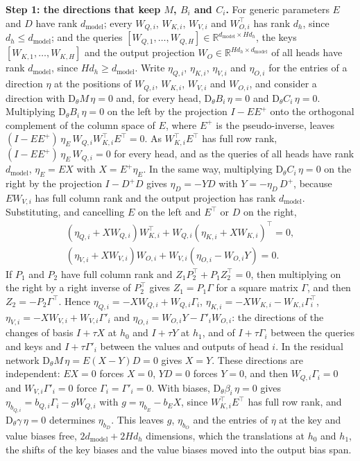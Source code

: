 \documentclass[10pt]{article}
\theoremstyle{definition}
\theoremstyle{remark}
\newcommand{\R}{\mathbb{R}}
\newcommand{\dm}{d_{\mathrm{model}}}
\newcommand{\Der}{\mathrm{D}}
\newcommand{\para}[1]{\smallskip\noindent\textbf{#1}\hspace{0.5em}}
\begin{document}
\para{Step 1: the directions that keep $M$, $B_i$ and $C_i$.} For generic parameters $E$ and $D$ have rank $\dm$; every $W_{Q,i}$, $W_{K,i}$, $W_{V,i}$ and $W_{O,i}^\top$ has rank $d_h$, since $d_h \le \dm$; and the queries $[W_{Q,1}, \dots, W_{Q,H}] \in \R^{\dm\times Hd_h}$, the keys $[W_{K,1}, \dots, W_{K,H}]$ and the output projection $W_O \in \R^{Hd_h\times\dm}$ of all heads have rank $\dm$, since $Hd_h \ge \dm$. Write $\eta_{Q,i}$, $\eta_{K,i}$, $\eta_{V,i}$ and $\eta_{O,i}$ for the entries of a direction $\eta$ at the positions of $W_{Q,i}$, $W_{K,i}$, $W_{V,i}$ and $W_{O,i}$, and consider a direction with $\Der_\theta M\,\eta = 0$ and, for every head, $\Der_\theta B_i\,\eta = 0$ and $\Der_\theta C_i\,\eta = 0$. Multiplying $\Der_\theta B_i\,\eta = 0$ on the left by the projection $I - EE^+$ onto the orthogonal complement of the column space of $E$, where $E^+$ is the pseudo-inverse, leaves $(I - EE^+)\,\eta_E\,W_{Q,i}W_{K,i}^\top E^\top = 0$. As $W_{K,i}^\top E^\top$ has full row rank, $(I - EE^+)\,\eta_E\,W_{Q,i} = 0$ for every head, and as the queries of all heads have rank $\dm$, $\eta_E = EX$ with $X = E^+\eta_E$. In the same way, multiplying $\Der_\theta C_i\,\eta = 0$ on the right by the projection $I - D^+D$ gives $\eta_D = -YD$ with $Y = -\eta_D\,D^+$, because $EW_{V,i}$ has full column rank and the output projection has rank $\dm$. Substituting, and cancelling $E$ on the left and $E^\top$ or $D$ on the right,
\begin{gather*}
(\eta_{Q,i} + XW_{Q,i})W_{K,i}^\top + W_{Q,i}(\eta_{K,i} + XW_{K,i})^\top = 0,\\
(\eta_{V,i} + XW_{V,i})W_{O,i} + W_{V,i}(\eta_{O,i} - W_{O,i}Y) = 0.
\end{gather*}
If $P_1$ and $P_2$ have full column rank and $Z_1P_2^\top + P_1Z_2^\top = 0$, then multiplying on the right by a right inverse of $P_2^\top$ gives $Z_1 = P_1\Gamma$ for a square matrix $\Gamma$, and then $Z_2 = -P_2\Gamma^\top$. Hence $\eta_{Q,i} = -XW_{Q,i} + W_{Q,i}\Gamma_i$, $\eta_{K,i} = -XW_{K,i} - W_{K,i}\Gamma_i^\top$, $\eta_{V,i} = -XW_{V,i} + W_{V,i}\Gamma'_i$ and $\eta_{O,i} = W_{O,i}Y - \Gamma'_iW_{O,i}$: the directions of the changes of basis $I + \tau X$ at $h_0$ and $I + \tau Y$ at $h_1$, and of $I + \tau \Gamma_i$ between the queries and keys and $I + \tau \Gamma'_i$ between the values and outputs of head $i$. In the residual network $\Der_\theta M\,\eta = E(X - Y)D = 0$ gives $X = Y$. These directions are independent: $EX = 0$ forces $X = 0$, $YD = 0$ forces $Y = 0$, and then $W_{Q,i}\Gamma_i = 0$ and $W_{V,i}\Gamma'_i = 0$ force $\Gamma_i = \Gamma'_i = 0$. With biases, $\Der_\theta\beta_i\,\eta = 0$ gives $\eta_{b_{Q,i}} = b_{Q,i}\Gamma_i - gW_{Q,i}$ with $g = \eta_{b_E} - b_EX$, since $W_{K,i}^\top E^\top$ has full row rank, and $\Der_\theta\gamma\,\eta = 0$ determines $\eta_{b_D}$. This leaves $g$, $\eta_{b_O}$ and the entries of $\eta$ at the key and value biases free, $2\dm + 2Hd_h$ dimensions, which the translations at $h_0$ and $h_1$, the shifts of the key biases and the value biases moved into the output bias span.
\end{document}
